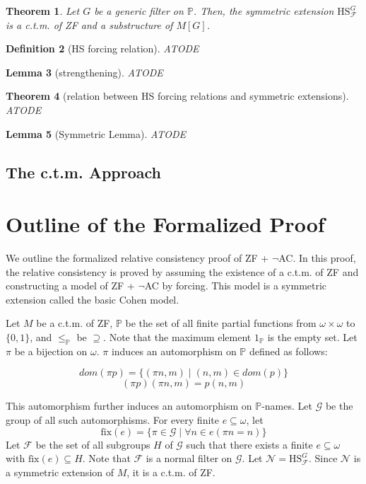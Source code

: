 \documentclass{report}
\newtheorem{thm}{Theorem}[chapter]
\newtheorem{lem}[thm]{Lemma}
\newtheorem{dfn}[thm]{Definition}
\newcommand{\Pbb}{\mathbb{P}}
\newcommand{\Gcal}{\mathcal{G}}
\newcommand{\Fcal}{\mathcal{F}}
\newcommand{\Ncal}{\mathcal{N}}
\begin{document}
\begin{thm}
  Let $G$ be a generic filter on $\Pbb$. Then, the symmetric extension $\text{HS}^{G}_{\Fcal}$ is a c.t.m. of ZF and a substructure of $M[G]$.
\end{thm}

\begin{dfn} [HS forcing relation]
  ATODE
\end{dfn}

\begin{lem}[strengthening]
  ATODE
\end{lem}

\begin{thm} [relation between HS forcing relations and symmetric extensions]
  ATODE
\end{thm}

\begin{lem} [Symmetric Lemma]
  ATODE
\end{lem}

\section{The c.t.m. Approach}\label{sec:ctm}

\chapter{Outline of the Formalized Proof}
We outline the formalized relative consistency proof of ZF + $\neg$AC. 
In this proof, the relative consistency is proved by assuming the existence of a c.t.m. of ZF and constructing a model of ZF + $\neg$AC by forcing. 
This model is a symmetric extension called the basic Cohen model.

Let $M$ be a c.t.m. of ZF, $\Pbb$ be the set of all finite partial functions from $\omega \times \omega$ to $\{0, 1\}$, and $\leq_{\Pbb}$ be $\supseteq$.
Note that the maximum element $1_{\Pbb}$ is the empty set. 
Let $\pi$ be a bijection on $\omega$. $\pi$ induces an automorphism on $\Pbb$ defined as follows:

$$dom(\pi p) = \{ (\pi n, m) \mid (n, m) \in dom(p) \}$$
$$(\pi p)(\pi n, m) = p(n, m)$$

This automorphism further induces an automorphism on $\Pbb$-names. 
Let $\Gcal$ be the group of all such automorphisms.
For every finite $e \subseteq \omega$, let 
$$\text{fix}(e) = \{ \pi \in \Gcal \mid \forall n \in e (\pi n = n) \}$$
Let $\Fcal$ be the set of all subgroups $H$ of $\Gcal$ such that there exists a finite $e \subseteq \omega$ with $\text{fix}(e) \subseteq H$.
Note that $\Fcal$ is a normal filter on $\Gcal$. Let $\Ncal = \text{HS}^{G}_{\Fcal}$.
Since $\Ncal$ is a symmetric extension of $M$, it is a c.t.m. of ZF. 
\end{document}
